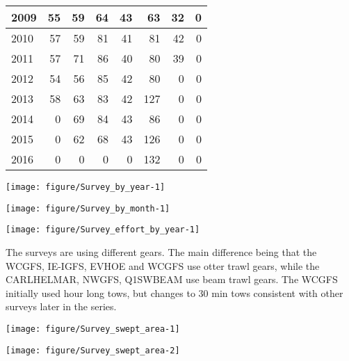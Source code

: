 \documentclass[12pt]{article}\usepackage[]{graphicx}\usepackage[]{color}
\makeatletter
\def\maxwidth{ %
  \ifdim\Gin@nat@width>\linewidth
    \linewidth
  \else
    \Gin@nat@width
  \fi
}
\newenvironment{knitrout}{}{} %
\makeatother
\begin{document}
\begin{knitrout}
\begin{tabular}{l|r|r|r|r|r|r|r}
\hline
2009 & 55 & 59 & 64 & 43 & 63 & 32 & 0\\
\hline
2010 & 57 & 59 & 81 & 41 & 81 & 42 & 0\\
\hline
2011 & 57 & 71 & 86 & 40 & 80 & 39 & 0\\
\hline
2012 & 54 & 56 & 85 & 42 & 80 & 0 & 0\\
\hline
2013 & 58 & 63 & 83 & 42 & 127 & 0 & 0\\
\hline
2014 & 0 & 69 & 84 & 43 & 86 & 0 & 0\\
\hline
2015 & 0 & 62 & 68 & 43 & 126 & 0 & 0\\
\hline
2016 & 0 & 0 & 0 & 0 & 132 & 0 & 0\\
\hline
\end{tabular}



{\centering \texttt{[image: figure/Survey\_by\_year-1]} 

}



\end{knitrout}

\begin{knitrout}\footnotesize
{}\color{fgcolor}

{\centering \texttt{[image: figure/Survey\_by\_month-1]} 

}



\end{knitrout}

\begin{knitrout}\footnotesize
{}\color{fgcolor}

{\centering \texttt{[image: figure/Survey\_effort\_by\_year-1]} 

}



\end{knitrout}

The surveys are using different gears. The main difference being that the
WCGFS, IE-IGFS, EVHOE and WCGFS use otter trawl gears, while the CARLHELMAR,
NWGFS, Q1SWBEAM use beam trawl gears. The WCGFS initially used hour long tows,
but changes to 30 min tows consistent with other surveys later in the series. \\ 

\begin{knitrout}\footnotesize
{}\color{fgcolor}

{\centering \texttt{[image: figure/Survey\_swept\_area-1]} 

}




{\centering \texttt{[image: figure/Survey\_swept\_area-2]} 

}



\end{knitrout}
\end{document}
